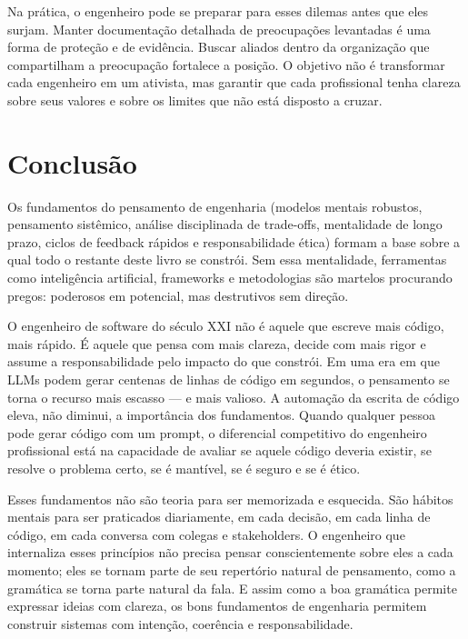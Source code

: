 Na prática, o engenheiro pode se preparar para esses dilemas antes que
eles surjam. Manter documentação detalhada de preocupações levantadas é
uma forma de proteção e de evidência. Buscar aliados dentro da
organização que compartilham a preocupação fortalece a posição. O
objetivo não é transformar cada engenheiro em um ativista, mas garantir
que cada profissional tenha clareza sobre seus valores e sobre os
limites que não está disposto a cruzar.

\section{Conclusão}

Os fundamentos do pensamento de engenharia (modelos mentais robustos,
pensamento sistêmico, análise disciplinada de trade-offs, mentalidade de
longo prazo, ciclos de feedback rápidos e responsabilidade ética)
formam a base sobre a qual todo o restante deste livro se constrói. Sem
essa mentalidade, ferramentas como inteligência artificial, frameworks e
metodologias são martelos procurando pregos: poderosos em potencial, mas
destrutivos sem direção.

O engenheiro de software do século XXI não é aquele que escreve mais
código, mais rápido. É aquele que pensa com mais clareza, decide com
mais rigor e assume a responsabilidade pelo impacto do que constrói. Em
uma era em que LLMs podem gerar centenas de linhas de código em segundos,
o pensamento se torna o recurso mais escasso --- e mais valioso. A
automação da escrita de código eleva, não diminui, a importância dos
fundamentos. Quando qualquer pessoa pode gerar código com um prompt, o
diferencial competitivo do engenheiro profissional está na capacidade de
avaliar se aquele código deveria existir, se resolve o problema certo,
se é mantível, se é seguro e se é ético.

Esses fundamentos não são teoria para ser memorizada e esquecida. São
hábitos mentais para ser praticados diariamente, em cada decisão, em
cada linha de código, em cada conversa com colegas e stakeholders. O
engenheiro que internaliza esses princípios não precisa pensar
conscientemente sobre eles a cada momento; eles se tornam parte de
seu repertório natural de pensamento, como a gramática se torna parte
natural da fala. E assim como a boa gramática permite expressar ideias
com clareza, os bons fundamentos de engenharia permitem construir
sistemas com intenção, coerência e responsabilidade.

